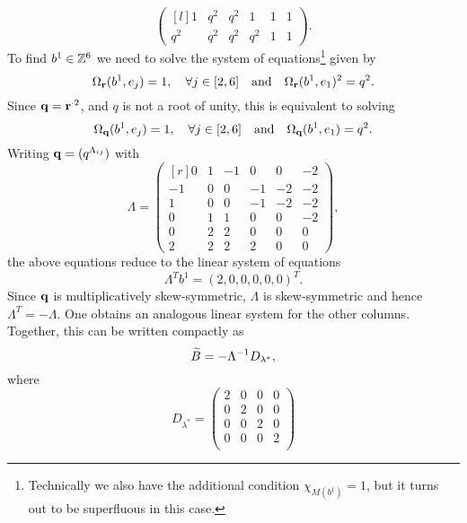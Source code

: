 \begin{example}
\begin{equation*}
\begin{pmatrix*}[l]
			1     & q^2 & q^2   & 1      & 1      & 1      \\
			q^2   & q^2 & q^2   & q^2    & 1      & 1
		\end{pmatrix*}.
	\end{equation*}
	To find $b^1 \in \mathbb{Z}^6$ we need to solve the system of equations\footnote{Technically we also have the additional condition $\chi_{M(b^1)} = 1$, but it turns out to be superfluous in this case.} given by
	\begin{equation*}
		\Omega_{\mathbf{r}}(b^1, e_j) = 1, \quad \forall j \in [2, 6] \quad \text{and}\quad \Omega_{\mathbf{r}}(b^1, e_1)^2 = q^2.
	\end{equation*}
	Since $\mathbf{q} = \mathbf{r}^{\cdot 2}$, and $q$ is not a root of unity, this is equivalent to solving
	\begin{equation*}
		\Omega_{\mathbf{q}}(b^1, e_j) = 1, \quad \forall j \in [2, 6] \quad \text{and}\quad \Omega_{\mathbf{q}}(b^1, e_1) = q^2.
	\end{equation*}
	Writing $\mathbf{q} = (q^{\Lambda_{ij}})$ with
	\begin{equation*}
		\Lambda = \begin{pmatrix*}[r]
			0  & 1 & -1 & 0  & 0  & -2 \\
			-1 & 0 & 0  & -1 & -2 & -2 \\
			1  & 0 & 0  & -1 & -2 & -2 \\
			0  & 1 & 1  & 0  & 0  & -2 \\
			0  & 2 & 2  & 0  & 0  & 0  \\
			2  & 2 & 2  & 2  & 0  & 0
		\end{pmatrix*},
	\end{equation*}
	the above equations reduce to the linear system of equations
	\begin{equation*}
		\Lambda^T b^1 = (2,0,0,0,0,0)^T.
	\end{equation*}
	Since $\mathbf{q}$ is multiplicatively skew-symmetric, $\Lambda$ is skew-symmetric and hence $\Lambda^T = - \Lambda$. One obtains an analogous linear system for the other columns. Together, this can be written compactly as
	\begin{equation*}
		\widetilde{B} = -\Lambda{^{-1}}D_{\lambda^*},
	\end{equation*}
	where
	\begin{equation*}
		D_{\lambda^*} =
		\begin{pmatrix}
			2 & 0 & 0 & 0 \\
			0 & 2 & 0 & 0 \\
			0 & 0 & 2 & 0 \\
			0 & 0 & 0 & 2 \\

\end{pmatrix}
\end{equation*}
\end{example}
